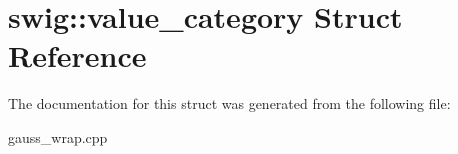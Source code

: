 \hypertarget{structswig_1_1value__category}{\section{swig\-:\-:value\-\_\-category Struct Reference}
\label{structswig_1_1value__category}
}


The documentation for this struct was generated from the following file\-:\begin{DoxyCompactItemize}
\item 
gauss\-\_\-wrap.\-cpp\end{DoxyCompactItemize}
